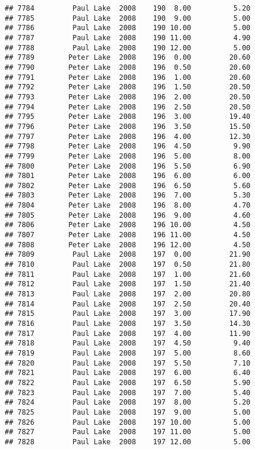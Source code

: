 \documentclass[
]{article}
\begin{document}
\begin{verbatim}
## 7784         Paul Lake  2008    190  8.00          5.20
## 7785         Paul Lake  2008    190  9.00          5.00
## 7786         Paul Lake  2008    190 10.00          5.00
## 7787         Paul Lake  2008    190 11.00          4.90
## 7788         Paul Lake  2008    190 12.00          5.00
## 7789        Peter Lake  2008    196  0.00         20.60
## 7790        Peter Lake  2008    196  0.50         20.60
## 7791        Peter Lake  2008    196  1.00         20.60
## 7792        Peter Lake  2008    196  1.50         20.50
## 7793        Peter Lake  2008    196  2.00         20.50
## 7794        Peter Lake  2008    196  2.50         20.50
## 7795        Peter Lake  2008    196  3.00         19.40
## 7796        Peter Lake  2008    196  3.50         15.50
## 7797        Peter Lake  2008    196  4.00         12.30
## 7798        Peter Lake  2008    196  4.50          9.90
## 7799        Peter Lake  2008    196  5.00          8.00
## 7800        Peter Lake  2008    196  5.50          6.90
## 7801        Peter Lake  2008    196  6.00          6.00
## 7802        Peter Lake  2008    196  6.50          5.60
## 7803        Peter Lake  2008    196  7.00          5.30
## 7804        Peter Lake  2008    196  8.00          4.70
## 7805        Peter Lake  2008    196  9.00          4.60
## 7806        Peter Lake  2008    196 10.00          4.50
## 7807        Peter Lake  2008    196 11.00          4.50
## 7808        Peter Lake  2008    196 12.00          4.50
## 7809         Paul Lake  2008    197  0.00         21.90
## 7810         Paul Lake  2008    197  0.50         21.80
## 7811         Paul Lake  2008    197  1.00         21.60
## 7812         Paul Lake  2008    197  1.50         21.40
## 7813         Paul Lake  2008    197  2.00         20.80
## 7814         Paul Lake  2008    197  2.50         20.40
## 7815         Paul Lake  2008    197  3.00         17.90
## 7816         Paul Lake  2008    197  3.50         14.30
## 7817         Paul Lake  2008    197  4.00         11.90
## 7818         Paul Lake  2008    197  4.50          9.40
## 7819         Paul Lake  2008    197  5.00          8.60
## 7820         Paul Lake  2008    197  5.50          7.10
## 7821         Paul Lake  2008    197  6.00          6.40
## 7822         Paul Lake  2008    197  6.50          5.90
## 7823         Paul Lake  2008    197  7.00          5.40
## 7824         Paul Lake  2008    197  8.00          5.20
## 7825         Paul Lake  2008    197  9.00          5.00
## 7826         Paul Lake  2008    197 10.00          5.00
## 7827         Paul Lake  2008    197 11.00          5.00
## 7828         Paul Lake  2008    197 12.00          5.00

\end{verbatim}
\end{document}

